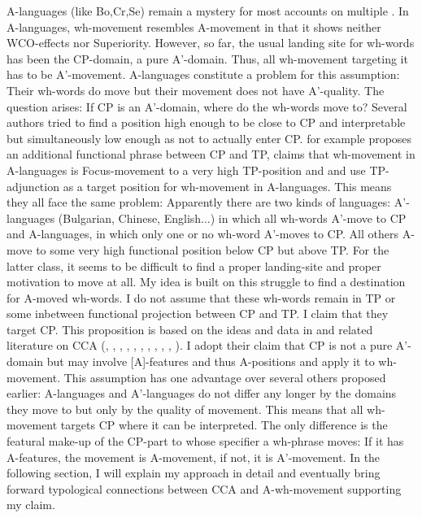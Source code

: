 \documentclass[output=paper,colorlinks,citecolor=brown]{langscibook}
\begin{document}
A-languages (like Bo,Cr,Se) remain a mystery for most accounts on multiple . In A-languages, wh-movement resembles A-movement in that it shows neither WCO-effects nor Superiority. However, so far, the usual landing site for wh-words has been the CP-domain, a pure A'-domain. Thus, all wh-movement targeting it has to be A'-movement. A-languages constitute a problem for this assumption: Their wh-words do move but their movement does not have A'-quality. The question arises: If CP is an A'-domain, where do the wh-words move to? Several authors tried to find a position high enough to be close to CP and interpretable but simultaneously low enough as not to actually enter CP. \cite{citko1998multiple} for example proposes an additional functional phrase between CP and TP, \cite{bovskovic2002multiple} claims that wh-movement in A-languages is Focus-movement to a very high TP-position and \cite{rudin1988multiple} and \cite{richards1997} use TP-adjunction as a target position for wh-movement in A-languages. This means they all face the same problem: Apparently there are two kinds of languages: A'-languages (Bulgarian, Chinese, English...) in which all wh-words A'-move to CP and A-languages, in which only one or no wh-word A'-moves to CP. All others A-move to some very high functional position below CP but above TP. For the latter class, it seems to be difficult to find a proper landing-site and proper motivation to move at all. My idea is built on this struggle to find a destination for A-moved wh-words. I do not assume that these wh-words remain in TP or some inbetween functional projection between CP and TP. I claim that they target CP. This proposition is based on the ideas and data in \cite{wurmbrand2018cross} and related literature on CCA (\citealp{tanaka2002raising}, \citealp{csener2008non}, \citealp{takeuchi2010exceptional}, \citealp{alboiu2011case}, \citealp{obata2011feature}, \citealp{vanUrk2015}, \citealp{bondarenko2017ecm}, \citealp{zyman2017p}, \citealp{zyman2018rich}, \citealp{wurmbrand2018cross}, \citealp{fong2019proper}). I adopt their claim that CP is not a pure A'-domain but may involve [A]-features and thus A-positions and apply it to wh-movement. This assumption has one advantage over several others proposed earlier: A-languages and A'-languages do not differ any longer by the domains they move to but only by the quality of movement. This means that all wh-movement targets CP where it can be interpreted. The only difference is the featural make-up of the CP-part to whose specifier a wh-phrase moves: If it has A-features, the movement is A-movement, if not, it is A'-movement. In the following section, I will explain my approach in detail and eventually bring forward typological connections between CCA and A-wh-movement supporting my claim. 
\end{document}
